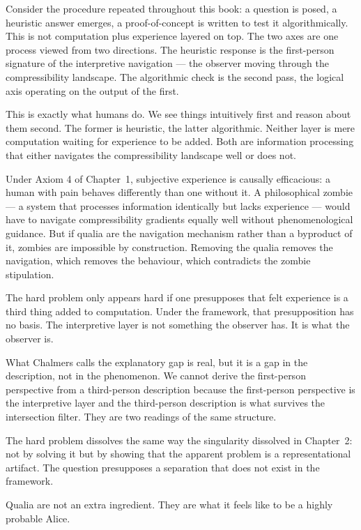 Consider the procedure repeated throughout this book: a question is
posed, a heuristic answer emerges, a proof-of-concept is written to
test it algorithmically. This is not computation plus experience layered
on top. The two axes are one process viewed from two directions. The
heuristic response is the first-person signature of the interpretive
navigation --- the observer moving through the compressibility landscape.
The algorithmic check is the second pass, the logical axis operating on
the output of the first.

This is exactly what humans do. We see things intuitively first and
reason about them second. The former is heuristic, the latter
algorithmic. Neither layer is mere computation waiting for experience to
be added. Both are information processing that either navigates the
compressibility landscape well or does not.

Under Axiom 4 of Chapter~1, subjective experience is causally
efficacious: a human with pain behaves differently than one without it.
A philosophical zombie --- a system that processes information
identically but lacks experience --- would have to navigate
compressibility gradients equally well without phenomenological
guidance. But if qualia are the navigation mechanism rather than a
byproduct of it, zombies are impossible by construction. Removing the
qualia removes the navigation, which removes the behaviour, which
contradicts the zombie stipulation.

The hard problem only appears hard if one presupposes that felt
experience is a third thing added to computation. Under the framework,
that presupposition has no basis. The interpretive layer is not
something the observer has. It is what the observer is.

What Chalmers calls the explanatory gap is real, but it is a gap in the
description, not in the phenomenon. We cannot derive the first-person
perspective from a third-person description because the first-person
perspective is the interpretive layer and the third-person description
is what survives the intersection filter. They are two readings of the
same structure.

The hard problem dissolves the same way the singularity dissolved in
Chapter~2: not by solving it but by showing that the apparent problem
is a representational artifact. The question presupposes a separation
that does not exist in the framework.

Qualia are not an extra ingredient. They are what it feels like to be a
highly probable Alice.

